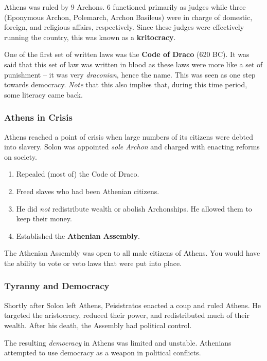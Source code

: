 \documentclass[letterpaper]{article}
\begin{document}
\bigskip

Athens was ruled by 9 Archons. 6 functioned primarily as judges while three (Eponymous Archon, Polemarch, Archon Basileus) were in charge of domestic, foreign, and religious affairs, respectively. Since these judges were effectively running the country, this was known as a \textbf{kritocracy}.

\bigskip 

One of the first set of written laws was the \textbf{Code of Draco} (620 BC). It was said that this set of law was written in blood as these laws were more like a set of punishment -- it was very \emph{draconian}, hence the name. This was seen as one step towards democracy. \emph{Note} that this also implies that, during this time period, some literacy came back. 

\subsubsection{Athens in Crisis}
Athens reached a point of crisis when large numbers of its citizens were debted into slavery. Solon was appointed \emph{sole Archon} and charged with enacting reforms on society. 
\begin{enumerate}
    \item Repealed (most of) the Code of Draco. 
    \item Freed slaves who had been Athenian citizens. 
    \item He did \emph{not} redistribute wealth or abolish Archonships. He allowed them to keep their money. 
    \item Established the \textbf{Athenian Assembly}.
\end{enumerate}
The Athenian Assembly was open to all male citizens of Athens. You would have the ability to vote or veto laws that were put into place. 

\subsubsection{Tyranny and Democracy}
Shortly after Solon left Athens, Peisistratos enacted a coup and ruled Athens. He targeted the aristocracy, reduced their power, and redistributed much of their wealth. After his death, the Assembly had political control. 

\bigskip 

The resulting \emph{democracy} in Athens was limited and unstable. Athenians attempted to use democracy as a weapon in political conflicts. 
\end{document}
